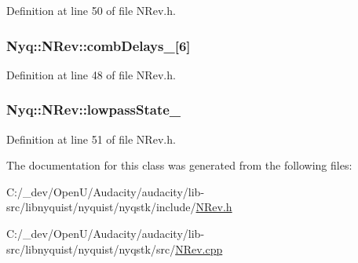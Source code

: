 Definition at line 50 of file N\+Rev.\+h.

\subsubsection[{\texorpdfstring{comb\+Delays\+\_\+}{combDelays_}}]{ Nyq\+::\+N\+Rev\+::comb\+Delays\+\_\+\mbox{[}6\mbox{]}\hspace{0.3cm}{\ttfamily [protected]}}\hypertarget{class_nyq_1_1_n_rev_a5b5befa663dee792beab473ba1d775bd}{}\label{class_nyq_1_1_n_rev_a5b5befa663dee792beab473ba1d775bd}


Definition at line 48 of file N\+Rev.\+h.

\subsubsection[{\texorpdfstring{lowpass\+State\+\_\+}{lowpassState_}}]{ Nyq\+::\+N\+Rev\+::lowpass\+State\+\_\+\hspace{0.3cm}{\ttfamily [protected]}}\hypertarget{class_nyq_1_1_n_rev_ab2dad2361fe84bc43a7f2c380f778570}{}\label{class_nyq_1_1_n_rev_ab2dad2361fe84bc43a7f2c380f778570}


Definition at line 51 of file N\+Rev.\+h.



The documentation for this class was generated from the following files\+:\begin{DoxyCompactItemize}
\item 
C\+:/\+\_\+dev/\+Open\+U/\+Audacity/audacity/lib-\/src/libnyquist/nyquist/nyqstk/include/\hyperlink{_n_rev_8h}{N\+Rev.\+h}\item 
C\+:/\+\_\+dev/\+Open\+U/\+Audacity/audacity/lib-\/src/libnyquist/nyquist/nyqstk/src/\hyperlink{_n_rev_8cpp}{N\+Rev.\+cpp}\end{DoxyCompactItemize}
